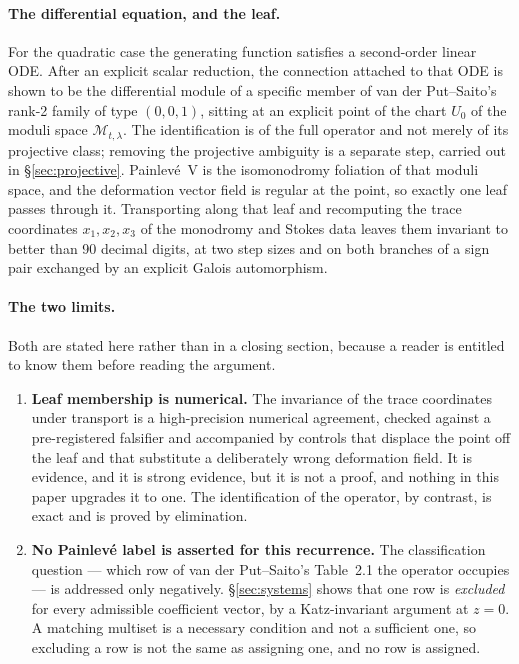 \paragraph{The differential equation, and the leaf.} For the quadratic case the
generating function satisfies a second-order linear ODE. After an explicit
scalar reduction, the connection attached to that ODE is shown to be the
differential module of a specific member of van der Put--Saito's rank-2 family
of type $(0,0,1)$, sitting at an explicit point of the chart $U_0$ of the moduli
space $\mathcal M_{t,\lambda}$. The identification is of the full operator and not merely
of its projective class; removing the projective ambiguity is a separate step,
carried out in \S\ref{sec:projective}. Painlev\'e~V is the isomonodromy
foliation of that moduli space, and the deformation vector field is regular at
the point, so exactly one leaf passes through it. Transporting along that leaf
and recomputing the trace coordinates $x_1,x_2,x_3$ of the monodromy and Stokes
data leaves them invariant to better than 90 decimal digits, at two step sizes
and on both branches of a sign pair exchanged by an explicit Galois
automorphism.

\paragraph{The two limits.} Both are stated here rather than in a closing
section, because a reader is entitled to know them before reading the argument.

\begin{enumerate}
\item \textbf{Leaf membership is numerical.} The invariance of the trace
  coordinates under transport is a high-precision numerical agreement, checked
  against a pre-registered falsifier and accompanied by controls that displace
  the point off the leaf and that substitute a deliberately wrong deformation
  field. It is evidence, and it is strong evidence, but it is not a proof, and
  nothing in this paper upgrades it to one. The identification of the operator,
  by contrast, is exact and is proved by elimination.

\item \textbf{No Painlev\'e label is asserted for this recurrence.} The
  classification question --- which row of van der Put--Saito's Table~2.1 the
  operator occupies --- is addressed only negatively. \S\ref{sec:systems} shows
  that one row is \emph{excluded} for every admissible coefficient vector, by a
  Katz-invariant argument at $z=0$. A matching multiset is a necessary condition
  and not a sufficient one, so excluding a row is not the same as assigning one,
  and no row is assigned.
\end{enumerate}

